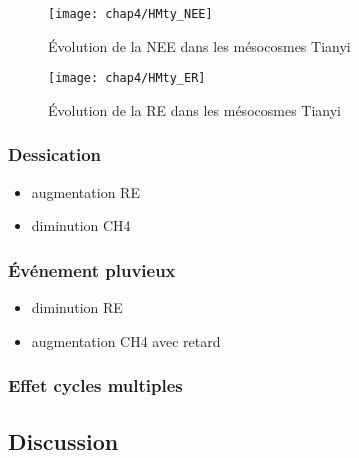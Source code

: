\begin{figure}
\centering
\texttt{[image: chap4/HMty\_NEE]}
\caption{Évolution de la NEE dans les mésocosmes Tianyi}
\label{fig:HMty_NEE}
\end{figure}

\begin{figure}
\centering
\texttt{[image: chap4/HMty\_ER]}
\caption{Évolution de la RE dans les mésocosmes Tianyi}
\label{fig:HMty_ER}
\end{figure}

\subsubsection{Dessication}

\begin{itemize}
\item augmentation RE
\item diminution CH4
\end{itemize}

\subsubsection{Événement pluvieux}

\begin{itemize}
\item diminution RE
\item augmentation CH4 avec retard
\end{itemize}

\subsubsection{Effet cycles multiples}

\subsection{Discussion}

